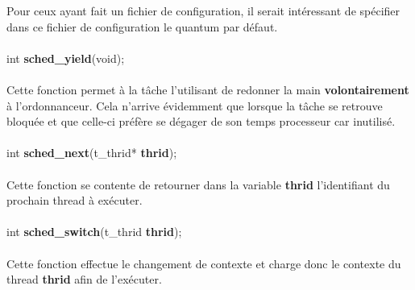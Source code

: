 \documentclass[10pt,a4wide]{article}
\begin{document}
Pour ceux ayant fait un fichier de configuration, il serait int\'eressant
de sp\'ecifier dans ce fichier de configuration le quantum par d\'efaut.

\paragraph{}

\hspace{1.5cm}int \textbf{sched\_yield}(void);

\paragraph{}

Cette fonction permet \`a la t\^ache l'utilisant de redonner la main
\textbf{volontairement} \`a l'ordonnanceur. Cela n'arrive \'evidemment
que lorsque la t\^ache se retrouve bloqu\'ee et que celle-ci pr\'ef\`ere
se d\'egager de son temps processeur car inutilis\'e.

\paragraph{}

\hspace{1.5cm}int \textbf{sched\_next}(t\_thrid* \textbf{thrid});

\paragraph{}

Cette fonction se contente de retourner dans la variable \textbf{thrid}
l'identifiant du prochain thread \`a ex\'ecuter.

\paragraph{}

\hspace{1.5cm}int \textbf{sched\_switch}(t\_thrid \textbf{thrid});

\paragraph{}

Cette fonction effectue le changement de contexte et charge donc le contexte
du thread \textbf{thrid} afin de l'ex\'ecuter.

\paragraph{}
\end{document}
